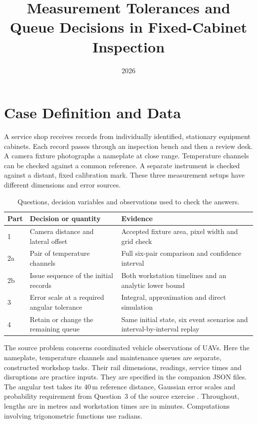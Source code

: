 \documentclass{swmcmthesis}
\title{Measurement Tolerances and Queue Decisions in Fixed-Cabinet Inspection}
\date{2026}
\begin{document}
\maketitle
\renewcommand{\contentsname}{Contents}
\tableofcontents
\clearpage

\section{Case Definition and Data}
A service shop receives records from individually identified, stationary equipment cabinets. Each record passes through an inspection bench and then a review desk. A camera fixture photographs a nameplate at close range. Temperature channels can be checked against a common reference. A separate instrument is checked against a distant, fixed calibration mark. These three measurement setups have different dimensions and error sources.

\begin{table}[H]\centering
\caption{Questions, decision variables and observations used to check the answers.}
\begin{tabular}{@{}p{.08\linewidth}p{.40\linewidth}p{.42\linewidth}@{}}
\toprule
Part & Decision or quantity & Evidence\\ \midrule
1 & Camera distance and lateral offset & Accepted fixture area, pixel width and grid check\\
2a & Pair of temperature channels & Full six-pair comparison and confidence interval\\
2b & Issue sequence of the initial records & Both workstation timelines and an analytic lower bound\\
3 & Error scale at a required angular tolerance & Integral, approximation and direct simulation\\
4 & Retain or change the remaining queue & Same initial state, six event scenarios and interval-by-interval replay\\
\bottomrule
\end{tabular}
\end{table}

The source problem concerns coordinated vehicle observations of UAVs. Here the nameplate, temperature channels and maintenance queues are separate, constructed workshop tasks. Their rail dimensions, readings, service times and disruptions are practice inputs. They are specified in the companion JSON files. The angular test takes its 40\,m reference distance, Gaussian error scales and probability requirement from Question~3 of the source exercise \cite{source}. Throughout, lengths are in metres and workstation times are in minutes. Computations involving trigonometric functions use radians.
\end{document}
